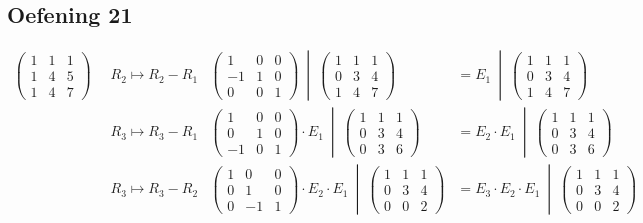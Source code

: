 \documentclass[lineaire_algebra_oplossingen.tex]{subfiles}
\begin{document}
\subsection{Oefening 21}
\begin{align*}
\begin{pmatrix}
1 & 1 & 1\\
1 & 4 & 5\\
1 & 4 & 7
\end{pmatrix}\;\;
&R_2 \longmapsto R_2-R_1
&\left.\begin{pmatrix}
1 & 0 & 0\\
-1 & 1 & 0\\
0 & 0 & 1
\end{pmatrix}
\ \middle|\ 
\begin{pmatrix}
1 & 1 & 1\\
0 & 3 & 4\\
1 & 4 & 7
\end{pmatrix}\right.
&=\left.
E_1
\ \middle|\ 
\begin{pmatrix}
1 & 1 & 1\\
0 & 3 & 4\\
1 & 4 & 7
\end{pmatrix}\right. \\
&R_3 \longmapsto R_3-R_1
&\left.\begin{pmatrix}
1 & 0 & 0\\
0 & 1 & 0\\
-1 & 0 & 1
\end{pmatrix}
\cdot E_1
\ \middle|\ 
\begin{pmatrix}
1 & 1 & 1\\
0 & 3 & 4\\
0 & 3 & 6
\end{pmatrix}\right.
&=\left.
E_2 \cdot E_1
\ \middle|\ 
\begin{pmatrix}
1 & 1 & 1\\
0 & 3 & 4\\
0 & 3 & 6
\end{pmatrix}\right. \\
&R_3 \longmapsto R_3-R_2
&\left.\begin{pmatrix}
1 & 0 & 0\\
0 & 1 & 0\\
0 & -1 & 1
\end{pmatrix}
\cdot E_2 \cdot E_1
\ \middle|\ 
\begin{pmatrix}
1 & 1 & 1\\
0 & 3 & 4\\
0 & 0 & 2
\end{pmatrix}\right.
&=\left.
E_3 \cdot E_2 \cdot E_1
\ \middle|\ 
\begin{pmatrix}
1 & 1 & 1\\
0 & 3 & 4\\
0 & 0 & 2
\end{pmatrix}\right.
\end{align*}
\end{document}
